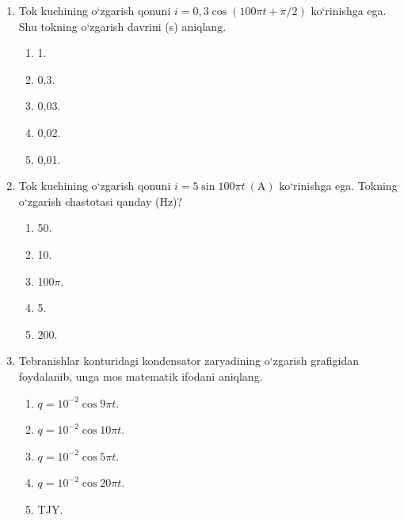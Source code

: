 \begin{enumerate}
\item Tok kuchining o‘zgarish qonuni $i=0,3\cos(100\pi t+\pi/2)$ ko‘rinishga ega. Shu tokning o‘zgarish davrini (s) aniqlang.
\begin{enumerate}[label=\Alph*)]
\item 1.
\item 0,3.
\item 0,03.
\item 0,02.
\item 0,01.
\end{enumerate}

\item Tok kuchining o‘zgarish qonuni $i=5\sin100\pi t \ (\text{A})$ ko‘rinishga ega. Tokning o‘zgarish chastotasi qanday (Hz)?
\begin{enumerate}[label=\Alph*)]
\item 50.
\item 10.
\item 100$\pi$.
\item 5.
\item 200.
\end{enumerate}

\item Tebranishlar konturidagi kondensator zaryadining o‘zgarish grafigidan foydalanib, unga mos matematik ifodani aniqlang.


\begin{enumerate}[label=\Alph*)]
\item $q=10^{-2}\cos9\pi t$.
\item $q=10^{-2}\cos10\pi t$.
\item $q=10^{-2}\cos5\pi t$.
\item $q=10^{-2}\cos20\pi t$.
\item TJY.
\end{enumerate}


\end{enumerate}
